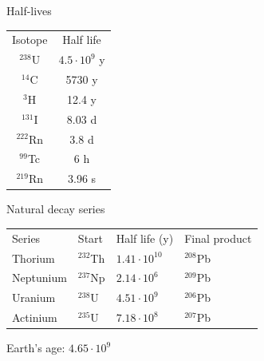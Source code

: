 \begin{frame}{Half-lives}

\begin{table}[H]
\vskip -0.5cm
\begin{center}
  \begin{tabular}{cc}
  \toprule
Isotope      & Half life     \\ \otoprule 
$^{238}$U   & $4.5\cdot 10^9$ y \\ 
$^{14}$C   & 5730 y \\
$^{3}$H   & 12.4 y \\
$^{131}$I   & 8.03 d \\
$^{222}$Rn   & 3.8 d \\ 
$^{99}$Tc   & 6 h \\ 
$^{219}$Rn   & 3.96 s \\ \bottomrule
\end{tabular}
\end{center}
\end{table}

\end{frame}

\begin{frame}{Natural decay series}

\begin{table}[H]
\vskip -0.5cm
\begin{center}
  \begin{tabular}{llll}
  \toprule
Series                                     & Start     & Half life (y)  & Final product \\ \otoprule 
Thorium & $^{232}$Th & $1.41\cdot 10^{10}$ & $^{208}$Pb \\
Neptunium & $^{237}$Np & $2.14\cdot 10^{6}$ & $^{209}$Pb \\  
Uranium & $^{238}$U & $4.51\cdot 10^{9}$ & $^{206}$Pb \\
Actinium & $^{235}$U & $7.18\cdot 10^{8}$ & $^{207}$Pb \\ \bottomrule
\end{tabular}
\end{center}
\end{table}

\centering
\alert{{\large Earth's age: $4.65\cdot 10^{9}$}}

\end{frame}

